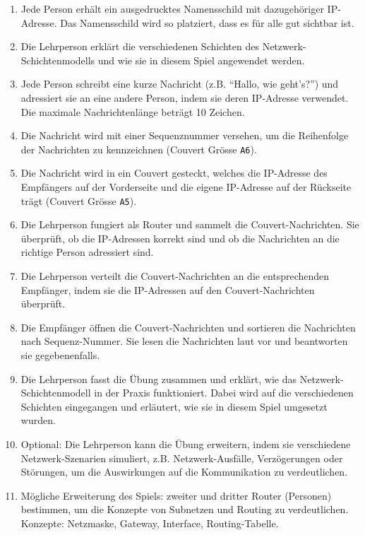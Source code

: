 \begin{enumerate}
	\item Jede Person erhält ein ausgedrucktes Namensschild mit dazugehöriger IP-Adresse. Das Namensschild wird so platziert, dass es für alle gut sichtbar ist.
	\item Die Lehrperson erklärt die verschiedenen Schichten des Netzwerk-Schichtenmodells und wie sie in diesem Spiel angewendet werden.
	\item Jede Person schreibt eine kurze Nachricht (z.B. ``Hallo, wie geht's?'') und adressiert sie an eine andere Person, indem sie deren IP-Adresse verwendet. Die maximale Nachrichtenlänge beträgt 10 Zeichen.
	\item Die Nachricht wird mit einer Sequenznummer versehen, um die Reihenfolge der Nachrichten zu kennzeichnen (Couvert Grösse \texttt{A6}).
	\item  Die Nachricht wird in ein Couvert gesteckt, welches die IP-Adresse des Empfängers auf der Vorderseite und die eigene IP-Adresse auf der Rückseite trägt (Couvert Grösse \texttt{A5}).
	\item Die Lehrperson fungiert als Router und sammelt die Couvert-Nachrichten. Sie überprüft, ob die IP-Adressen korrekt sind und ob die Nachrichten an die richtige Person adressiert sind.
	\item Die Lehrperson verteilt die Couvert-Nachrichten an die entsprechenden Empfänger, indem sie die IP-Adressen auf den Couvert-Nachrichten überprüft.
	\item Die Empfänger öffnen die Couvert-Nachrichten und sortieren die Nachrichten nach Sequenz-Nummer. Sie lesen die Nachrichten laut vor und beantworten sie gegebenenfalls.
	\item Die Lehrperson fasst die Übung zusammen und erklärt, wie das Netzwerk-Schichtenmodell in der Praxis funktioniert. Dabei wird auf die verschiedenen Schichten eingegangen und erläutert, wie sie in diesem Spiel umgesetzt wurden.
	\item Optional: Die Lehrperson kann die Übung erweitern, indem sie verschiedene Netzwerk-Szenarien simuliert, z.B. Netzwerk-Ausfälle, Verzögerungen oder Störungen, um die Auswirkungen auf die Kommunikation zu verdeutlichen.
	\item Mögliche Erweiterung des Spiels: zweiter und dritter Router (Personen) bestimmen, um die Konzepte von Subnetzen und Routing zu verdeutlichen. Konzepte: Netzmaske, Gateway, Interface, Routing-Tabelle.
\end{enumerate}